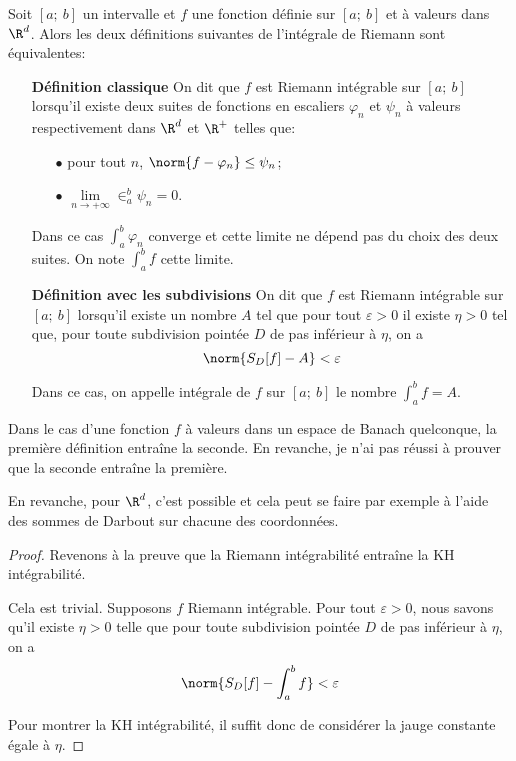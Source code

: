 \begin{de}
Soit $[a;~b]$ un intervalle et $f$ une fonction définie sur $[a;~b]$ et à valeurs dans $\R^d$. Alors les deux définitions suivantes de l'intégrale de Riemann sont équivalentes:

\begin{itemize}
\item[\bf Définition classique]
On dit que $f$ est Riemann intégrable sur $[a;~b]$ lorsqu'il existe deux suites de fonctions en escaliers $\varphi_n$ et $\psi_n$ à valeurs respectivement dans $\R^d$ et $\R^+$ telles que:
\begin{itemize}
\item[$\bullet$]
pour tout $n$, $\norm{f - \varphi_n} \leq \psi_n$;
\item[$\bullet$]
$\lim \limits_{n \to +\infty} \in_a^b \psi_n = 0$.
\end{itemize}
Dans ce cas $\int_a^b \varphi_n$ converge et cette limite ne dépend pas du choix des deux suites. On note $\int_a^b f$ cette limite.
\item[\bf Définition avec les subdivisions]
On dit que $f$ est Riemann intégrable sur $[a;~b]$ lorsqu'il existe un nombre $A$ tel que pour tout $\varepsilon>0$ il existe $\eta>0$ tel que, pour toute subdivision pointée $D$ de pas inférieur à $\eta$, on a
\[
\norm{S_D[f] - A} < \varepsilon
\]

Dans ce cas, on appelle intégrale de $f$ sur $[a;~b]$ le nombre $\int_a^b f = A$.
\end{itemize}
\end{de}


Dans le cas d'une fonction $f$ à valeurs dans un espace de Banach quelconque, la première définition entraîne la seconde. En revanche, je n'ai pas réussi à prouver que la seconde entraîne la première. 

En revanche, pour $\R^d$, c'est possible et cela peut se faire par exemple à l'aide des sommes de Darbout sur chacune des coordonnées.

\begin{proof}
Revenons à la preuve que la Riemann intégrabilité entraîne la KH intégrabilité.

Cela est trivial. Supposons $f$ Riemann intégrable. Pour tout $\varepsilon>0$, nous savons qu'il existe $\eta>0$ telle que pour toute subdivision pointée $D$ de pas inférieur à $\eta$, on a
\[
\norm{S_D[f]-\int_a^b f} < \varepsilon
\]

Pour montrer la KH intégrabilité, il suffit donc de considérer la jauge constante égale à $\eta$.
\end{proof}


